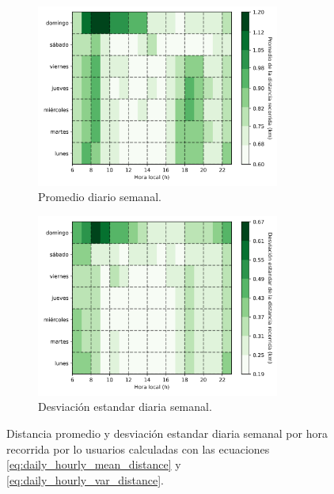 \begin{figure}[H]
    \centering
    \begin{subfigure}[b]{8cm}
        \includegraphics[width=8cm]{Graphics/daily_hourly_mean_distance.png}
        \caption{Promedio diario semanal.}
        \label{fig:daily_hourly_mean_distance}
    \end{subfigure}
    \begin{subfigure}[b]{8cm}
        \includegraphics[width=8cm]{Graphics/daily_hourly_var_distance.png}
        \caption{Desviación estandar diaria semanal.}
        \label{fig:daily_hourly_var_distance}
    \end{subfigure}
    \caption{Distancia promedio y desviación estandar diaria semanal por hora recorrida por lo usuarios calculadas con las ecuaciones \ref{eq:daily_hourly_mean_distance} y \ref{eq:daily_hourly_var_distance}.}
    \label{fig:daily_hourly_distance}
\end{figure}

